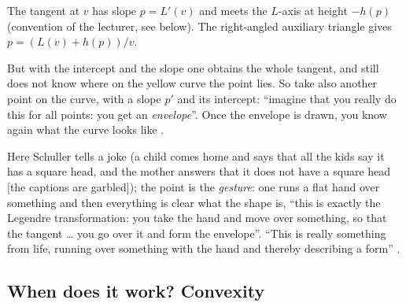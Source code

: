 \begin{paracol}{2}
\begin{nfigure}
\caption*{The tangent at $v$ has slope $p=L'(v)$ and meets the $L$-axis at height $-h(p)$ (convention of the lecturer, see below). The right-angled auxiliary triangle gives $p=(L(v)+h(p))/v$.}
\end{nfigure}

But with the intercept and the slope one obtains the whole tangent, and still does not know where on the yellow curve the point lies. So take also another point on the curve, with a slope $p'$ and its intercept: ``imagine that you really do this for all points: you get an \emph{envelope}''. Once the envelope is drawn, you know again what the curve looks like .

\begin{coursenote}\label{cn:lt-joke}
Here Schuller tells a joke (a child comes home and says that all the kids say it has a square head, and the mother answers that it does not have a square head [the captions are garbled]); the point is the \emph{gesture}: one runs a flat hand over something and then everything is clear what the shape is, ``this is exactly the Legendre transformation: you take the hand and move over something, so that the tangent \dots{} you go over it and form the envelope''. ``This is really something from life, running over something with the hand and thereby describing a form'' .
\end{coursenote}

\subsection{When does it work? Convexity}\label{ssec:lt-convex}


\end{paracol}
